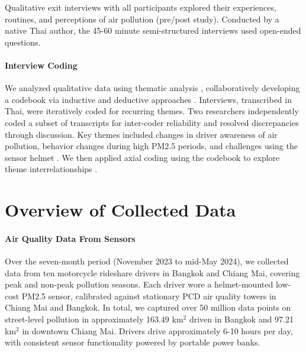 \documentclass[sigconf,screen,natbib=true]{acmart}
\begin{document}
Qualitative exit interviews with all participants explored their experiences, routines, and perceptions of air pollution (pre/post study).
Conducted by a native Thai author, the 45-60 minute semi-structured interviews used open-ended questions. 


\paragraph{Interview Coding}




We analyzed qualitative data using thematic analysis \cite{braun2006using}, collaboratively developing a codebook via inductive and deductive approaches \cite{saldana2021coding,kathleen2008team}.
Interviews, transcribed in Thai, were iteratively coded for recurring themes.
Two researchers independently coded a subset of transcripts for inter-coder reliability and resolved discrepancies through discussion.
Key themes included changes in driver awareness of air pollution, behavior changes during high PM2.5 periods, and challenges using the sensor helmet .
We then applied axial coding using the codebook to explore theme interrelationships \cite{williams2019art}.


 

\section{Overview of Collected Data}
\label{sec:result-overview-data}

\paragraph{Air Quality Data From Sensors}
Over the seven-month period (November 2023 to mid-May 2024), we collected data from ten motorcycle rideshare drivers in Bangkok and Chiang Mai, covering peak and non-peak pollution seasons.
Each driver wore a helmet-mounted low-cost PM2.5 sensor, calibrated against stationary PCD air quality towers in Chiang Mai and Bangkok.
In total, we captured over 50 million data points on street-level pollution in approximately 163.49 km$^2$ driven in Bangkok and 97.21 km$^2$ in downtown Chiang Mai.
Drivers drive approximately 6-10 hours per day, with consistent sensor functionality powered by portable power banks.
\end{document}
